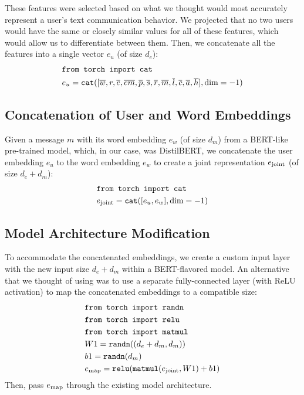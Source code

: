 \documentclass{article}
\begin{document}
These features were selected based on what we thought would most accurately represent a user's text communication behavior. We projected that no two users would have the same or closely similar values for all of these features, which would allow us to differentiate between them.
Then, we concatenate all the features into a single vector $e_u$ (of size $d_e$):
\begin{equation}
\begin{aligned}
&\text{\texttt{from torch import cat}} \\
&e_u = \textnormal{\texttt{cat}}([\overline{w}, r, \overline{e}, \overline{em}, \overline{p}, \overline{s}, \overline{r}, \overline{m}, \overline{l}, \overline{c}, \overline{a}, \overline{h}], \textnormal{dim}=-1)
\end{aligned}
\end{equation}
\subsection{Concatenation of User and Word Embeddings}
Given a message $m$ with its word embedding $e_w$ (of size $d_m$) from a BERT-like pre-trained model, which, in our case, was DistilBERT\cite{sanh2020distilbert}, we concatenate the user embedding $e_u$ to the word embedding $e_w$ to create a joint representation $e_\textnormal{joint}$ (of size $d_e + d_m$):
\begin{equation}
\begin{aligned}
&\text{\texttt{from torch import cat}} \\
&e_\textnormal{joint} = \textnormal{\texttt{cat}}([e_u, e_w], \textnormal{dim}=-1)
\end{aligned}
\end{equation}

\subsection{Model Architecture Modification}
To accommodate the concatenated embeddings, we create a custom input layer with the new input size $d_e + d_m$ within a BERT-flavored model. An alternative that we thought of using was to use a separate fully-connected layer (with ReLU activation) to map the concatenated embeddings to a compatible size:
\begin{equation}
\begin{aligned}
&\text{\texttt{from torch import randn}} \\
&\text{\texttt{from torch import relu}} \\
&\text{\texttt{from torch import matmul}} \\
&W1 = \text{\texttt{randn}}((d_e + d_m, d_m)) \\
&b1 = \text{\texttt{randn}}(d_m) \\
&e_\textnormal{map} = \text{\texttt{relu}}(\text{\texttt{matmul}}(e_\textnormal{joint}, W1) + b1)
\end{aligned}
\end{equation}
Then, pass $e_\textnormal{map}$ through the existing model architecture.
\end{document}
